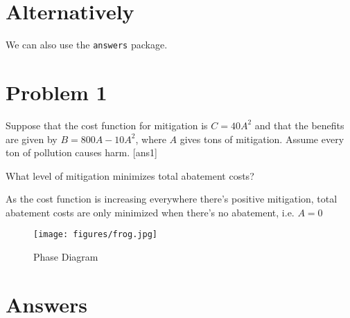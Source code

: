 
\section{Alternatively}

We can also use the \verb+answers+ package.

\section*{Problem 1}
 Suppose that the cost function for mitigation is $C=40A^2$ and that the benefits are given by $B=800A-10A^2$, where $A$ gives tons of mitigation. Assume every ton of pollution causes harm.
 [ans1] %
\begin{ex}
What level of mitigation minimizes total abatement costs?

\begin{sol}
  As the cost function is increasing everywhere there's positive mitigation, total abatement costs are only minimized when there's no abatement, i.e. $A=0$
\end{sol}
  \end{ex}
  
       \begin{figure}[H]
	\centering %
	\texttt{[image: figures/frog.jpg]}
	\caption{Phase Diagram} %
	\label{fig:ps02phasediag}
\end{figure}



\section{Answers}
